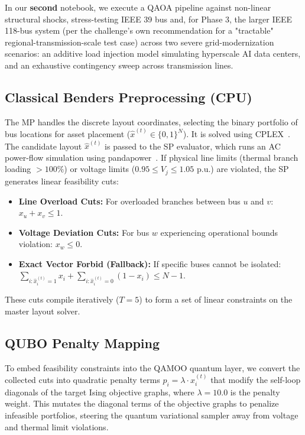 \documentclass[11pt]{article}
\begin{document}
In our \textbf{second} notebook, we execute a QAOA pipeline against non-linear structural shocks, stress-testing IEEE 39 bus and, for Phase 3, the larger IEEE 118-bus system (per the challenge's own recommendation for a "tractable" regional-transmission-scale test case) across two severe grid-modernization scenarios: an additive load injection model simulating hyperscale AI data centers, and an exhaustive contingency sweep across transmission lines.

\subsection{Classical Benders Preprocessing (CPU)}
The MP handles the discrete layout coordinates, selecting the binary portfolio of bus locations for asset placement ($\hat{x}^{(t)} \in \{0,1\}^N$). It is solved using CPLEX~\cite{cplex2024}. The candidate layout $\hat{x}^{(t)}$ is passed to the SP evaluator, which runs an AC power-flow simulation using pandapower~\cite{pandapower2018}. If physical line limits (thermal branch loading $> 100\%$) or voltage limits ($0.95 \le V_j \le 1.05$ p.u.) are violated, the SP generates linear feasibility cuts:
\begin{itemize}[leftmargin=*,noitemsep,topsep=0pt]
  \item \textbf{Line Overload Cuts:} For overloaded branches between bus $u$ and $v$: $x_u + x_v \le 1$.
  \item \textbf{Voltage Deviation Cuts:} For bus $w$ experiencing operational bounds violation: $x_w \le 0$.
  \item \textbf{Exact Vector Forbid (Fallback):} If specific buses cannot be isolated: $\sum_{i: \hat{x}_i^{(t)}=1} x_i + \sum_{i: \hat{x}_i^{(t)}=0} (1 - x_i) \le N - 1$.
\end{itemize}
These cuts compile iteratively ($T=5$) to form a set of linear constraints on the master layout solver.

\subsection{QUBO Penalty Mapping}
To embed feasibility constraints into the QAMOO quantum layer, we convert the collected cuts into quadratic penalty terms $p_i = \lambda \cdot \hat{x}_i^{(t)}$ that modify the self-loop diagonals of the target Ising objective graphs, where $\lambda = 10.0$ is the penalty weight. This mutates the diagonal terms of the objective graphs to penalize infeasible portfolios, steering the quantum variational sampler away from voltage and thermal limit violations.
\end{document}
